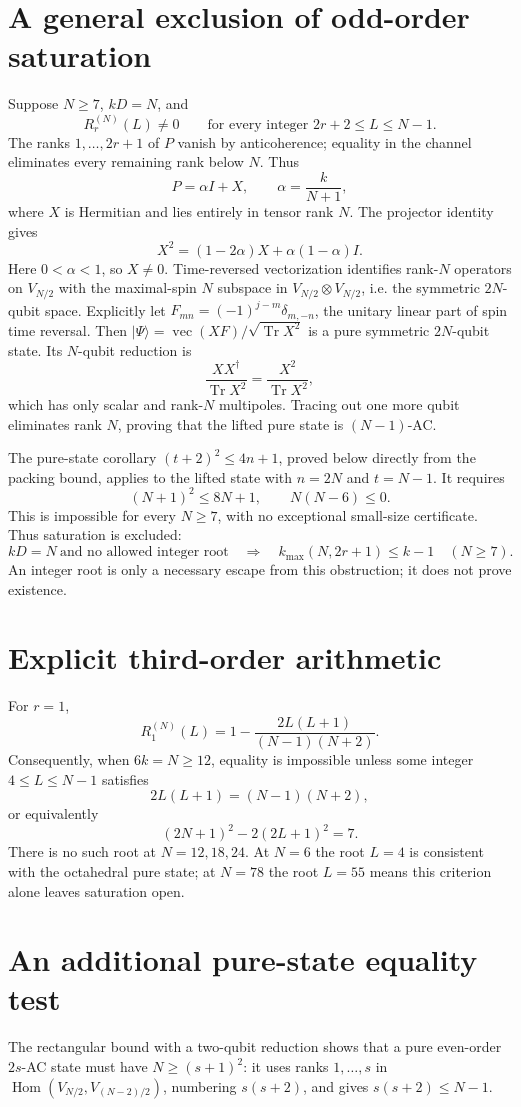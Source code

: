 \documentclass[11pt]{article}
\newcommand{\Tr}{\operatorname{Tr}}
\begin{document}
\section{A general exclusion of odd-order saturation}
Suppose $N\ge7$, $kD=N$, and
\[
R_r^{(N)}(L)\ne0\qquad\text{for every integer }2r+2\le L\le N-1.
\]
The ranks $1,\ldots,2r+1$ of $P$ vanish by anticoherence; equality in the channel eliminates every remaining rank below $N$. Thus
\[
P=\alpha I+X,\qquad \alpha=\frac{k}{N+1},
\]
where $X$ is Hermitian and lies entirely in tensor rank $N$. The projector identity gives
\[
X^2=(1-2\alpha)X+\alpha(1-\alpha)I.
\]
Here $0<\alpha<1$, so $X\ne0$. Time-reversed vectorization identifies rank-$N$ operators on $V_{N/2}$ with the maximal-spin $N$ subspace in $V_{N/2}\otimes V_{N/2}$, i.e. the symmetric $2N$-qubit space. Explicitly let $F_{mn}=(-1)^{j-m}\delta_{m,-n}$, the unitary linear part of spin time reversal. Then $|\Psi\rangle=\operatorname{vec}(XF)/\sqrt{\Tr X^2}$ is a pure symmetric $2N$-qubit state. Its $N$-qubit reduction is
\[
\frac{XX^{\dagger}}{\Tr X^2}=\frac{X^2}{\Tr X^2},
\]
which has only scalar and rank-$N$ multipoles. Tracing out one more qubit eliminates rank $N$, proving that the lifted pure state is $(N-1)$-AC.

The pure-state corollary $(t+2)^2\le4n+1$, proved below directly from the packing bound, applies to the lifted state with $n=2N$ and $t=N-1$. It requires
\[
(N+1)^2\le8N+1,\qquad N(N-6)\le0.
\]
This is impossible for every $N\ge7$, with no exceptional small-size certificate. Thus saturation is excluded:
\[
\boxed{kD=N\ \text{and no allowed integer root}\quad\Longrightarrow\quad
k_{\max}(N,2r+1)\le k-1\quad(N\ge7).}
\]
An integer root is only a necessary escape from this obstruction; it does not prove existence.

\section{Explicit third-order arithmetic}
For $r=1$,
\[
R_1^{(N)}(L)=1-\frac{2L(L+1)}{(N-1)(N+2)}.
\]
Consequently, when $6k=N\ge12$, equality is impossible unless some integer $4\le L\le N-1$ satisfies
\[
2L(L+1)=(N-1)(N+2),
\]
or equivalently
\[
(2N+1)^2-2(2L+1)^2=7.
\]
There is no such root at $N=12,18,24$. At $N=6$ the root $L=4$ is consistent with the octahedral pure state; at $N=78$ the root $L=55$ means this criterion alone leaves saturation open.

\section{An additional pure-state equality test}
The rectangular bound with a two-qubit reduction shows that a pure even-order $2s$-AC state must have $N\ge(s+1)^2$: it uses ranks $1,\ldots,s$ in $\operatorname{Hom}(V_{N/2},V_{(N-2)/2})$, numbering $s(s+2)$, and gives $s(s+2)\le N-1$.
\end{document}
